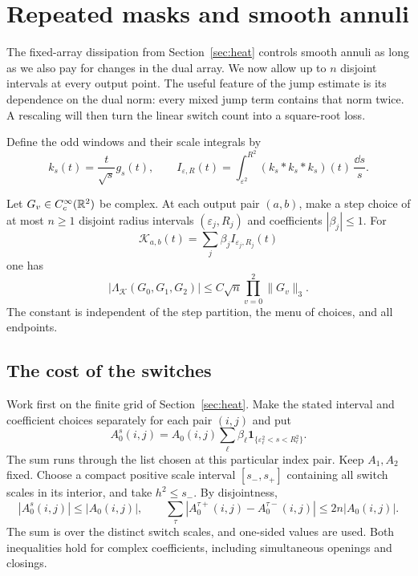\section{Repeated masks and smooth annuli}\label{sec:smooth}

The fixed-array dissipation from Section~\ref{sec:heat} controls smooth
annuli as long as we also pay for changes in the dual array. We now
allow up to $n$ disjoint intervals at every output point. The useful
feature of the jump estimate is its dependence on the dual norm:
every mixed jump term contains that norm twice. A rescaling will then
turn the linear switch count into a square-root loss.

Define the odd windows and their scale integrals by
\begin{equation}\label{eq:smooth-kernels}
 k_s(t)=\frac{t}{\sqrt s}g_s(t),\qquad
 I_{\varepsilon,R}(t)=\int_{\varepsilon^2}^{R^2}
       (k_s*k_s*k_s)(t)\,\frac{\dd s}{s}.
\end{equation}

\begin{proposition}
\label{prop:smooth-switches}
Let $G_v\in C_c^\infty(\mathbb R^2)$ be complex. At each output pair $(a,b)$,
make a step choice of at most $n\ge1$ disjoint radius intervals
$(\varepsilon_j,R_j)$ and coefficients $|\beta_j|\le1$. For
\[
 \mathcal K_{a,b}(t)=\sum_j\beta_j I_{\varepsilon_j,R_j}(t)
\]
one has
\[
 |\Lambda_{\mathcal K}(G_0,G_1,G_2)|
 \le C\sqrt n\prod_{v=0}^2\|G_v\|_3.
\]
The constant is independent of the step partition, the menu of choices,
and all endpoints.
\end{proposition}

\subsection{The cost of the switches}

Work first on the finite grid of Section~\ref{sec:heat}. Make the stated
interval and coefficient choices separately for each pair $(i,j)$ and put
\begin{equation}\label{eq:repeated-mask}
 A_0^s(i,j)=A_0(i,j)\sum_{\ell}\beta_\ell
                  \mathbf1_{\{\varepsilon_\ell^2<s<R_\ell^2\}}.
\end{equation}
The sum runs through the list chosen at this particular index pair.
Keep $A_1,A_2$ fixed. Choose a compact positive scale interval
$[s_-,s_+]$ containing all switch scales in its interior, and take
$h^2\le s_-$. By disjointness,
\begin{equation}\label{eq:mask-switch-count}
 |A_0^s(i,j)|\le |A_0(i,j)|,
 \qquad
 \sum_\tau|A_0^{\tau+}(i,j)-A_0^{\tau-}(i,j)|
 \le2n|A_0(i,j)|.
\end{equation}
The sum is over the distinct switch scales, and one-sided values are
used. Both inequalities hold for complex coefficients, including
simultaneous openings and closings.

